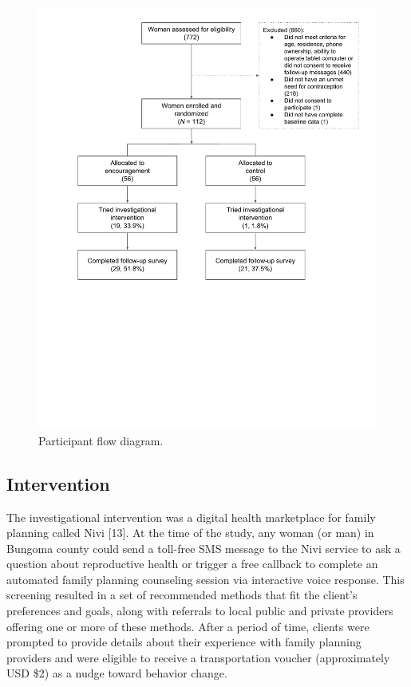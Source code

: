 \documentclass[man]{apa6}
\theoremstyle{definition}
\theoremstyle{definition}
\theoremstyle{definition}
\theoremstyle{remark}
\begin{document}
\begin{figure}
\centering
\includegraphics{../../input/figures/flow.pdf}
\caption{\label{fig:flow}Participant flow diagram.}
\end{figure}

\hypertarget{intervention}{%
\subsection{Intervention}\label{intervention}}

The investigational intervention was a digital health marketplace for
family planning called Nivi {[}13{]}. At the time of the study, any
woman (or man) in Bungoma county could send a toll-free SMS message to
the Nivi service to ask a question about reproductive health or trigger
a free callback to complete an automated family planning counseling
session via interactive voice response. This screening resulted in a set
of recommended methods that fit the client's preferences and goals,
along with referrals to local public and private providers offering one
or more of these methods. After a period of time, clients were prompted
to provide details about their experience with family planning providers
and were eligible to receive a transportation voucher (approximately USD
\$2) as a nudge toward behavior change.
\end{document}
